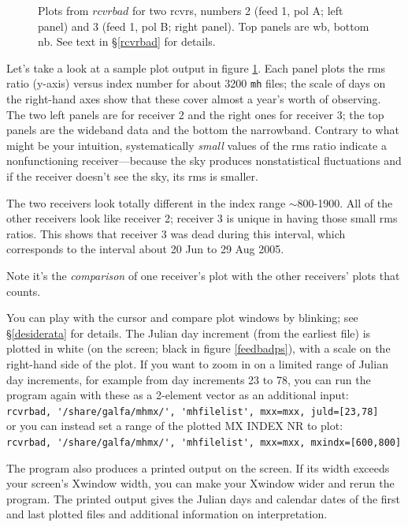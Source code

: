 \documentclass[psfig,preprint]{aastex}
\begin{document}
\begin{figure}[!h]
\begin{center}
\end{center}
\caption{Plots from $rcvrbad$ for two rcvrs, numbers 2 (feed 1, pol A;
left panel) 
and 3 (feed 1, pol B; right panel). Top panels are wb, bottom nb. 
See text in \S \ref{rcvrbad}
for details. \label{rcvrbadps}}
\end{figure}

	Let's take a look at a sample plot output in figure
\ref{rcvrbadps}.  Each panel plots the rms ratio (y-axis) versus index
number for about 3200 \verb$mh$ files; the scale of days on the
right-hand axes show that these cover almost a year's worth of
observing.  The two left panels are for receiver 2 and the right ones
for receiver 3; the top panels are the wideband data and the bottom the
narrowband.  Contrary to what might be your intuition, systematically
{\it small} values of the rms ratio indicate a nonfunctioning
receiver---because the sky produces nonstatistical fluctuations and if
the receiver doesn't see the sky, its rms is smaller. 

	The two receivers look totally different in the index range
$\sim 800$-1900. All of the other receivers look like receiver 2;
receiver 3 is unique in having those small rms ratios. This shows that
receiver 3 was dead during this interval, which corresponds to the
interval about 20 Jun to 29 Aug 2005.

	Note it's the {\it comparison} of one receiver's plot with the other
receivers' plots that counts. 

	You can play with the cursor and compare plot windows by
blinking; see \S \ref{desiderata} for details.  The Julian day increment
(from the earliest file) is plotted in white (on the screen; black in
figure \ref{feedbadps}), with a scale on the right-hand side of the
plot.  If you want to zoom in on a limited range of Julian day
increments, for example from day increments 23 to 78, you can run the
program again with these as a 2-element vector as an additional input: \\
\verb$rcvrbad, '/share/galfa/mhmx/', 'mhfilelist', mxx=mxx, juld=[23,78]$ \\
or you can instead set a range of the plotted MX INDEX
NR to plot: \\ 
\verb$rcvrbad, '/share/galfa/mhmx/', 'mhfilelist', mxx=mxx, mxindx=[600,800]$

	The program also produces a printed output on the screen.  If
its width exceeds your screen's Xwindow width, you can make your Xwindow
wider and rerun the program.  The printed output gives the Julian days
and calendar dates of the first and last plotted files and additional
information on interpretation. 
\end{document}
